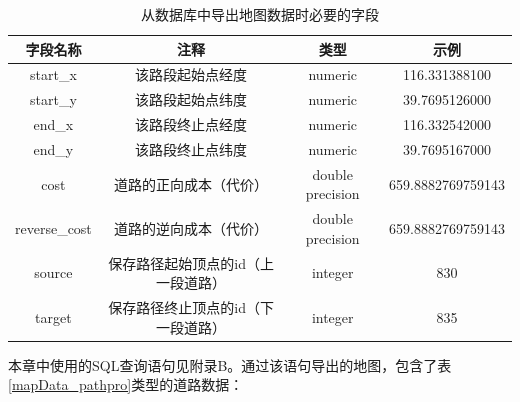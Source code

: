 \begin{table}[ht]
    \linespread{1.5}
    \centering
    \caption{从数据库中导出地图数据时必要的字段}
    \label{mapData_Addproperty}
    \begin{tabular}{cccc}
    \toprule
    字段名称 & 注释 & 类型 & 示例\\
    \midrule
    start\_x & 该路段起始点经度 & numeric & 116.331388100 \\
    start\_y & 该路段起始点纬度 & numeric & 39.7695126000 \\
    end\_x & 该路段终止点经度 & numeric & 116.332542000 \\
    end\_y & 该路段终止点纬度 & numeric & 39.7695167000 \\
    cost & 道路的正向成本（代价） & double precision & 659.8882769759143 \\
    reverse\_cost & 道路的逆向成本（代价） & double precision & 659.8882769759143 \\
    source & 保存路径起始顶点的id（上一段道路） & integer & 830 \\
    target & 保存路径终止顶点的id（下一段道路） & integer & 835 \\
    \bottomrule
    \end{tabular}
\end{table}

本章中使用的SQL查询语句见附录B。通过该语句导出的地图，包含了表\ref{mapData_pathpro}类型的道路数据：

